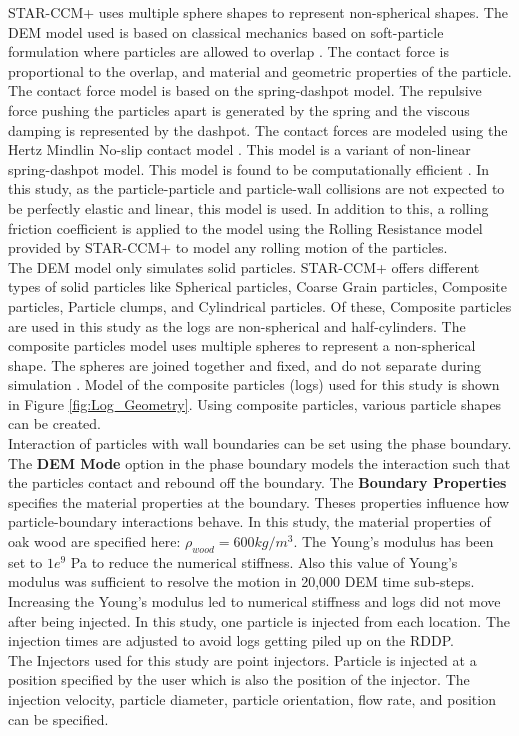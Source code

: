 STAR-CCM+ uses multiple sphere shapes to represent non-spherical shapes. The DEM model used is based on classical mechanics based on soft-particle formulation where particles are allowed to overlap \cite{DEM}. The contact force is proportional to the overlap, and material and geometric properties of the particle. The contact force model is based on the spring-dashpot model. The repulsive force pushing the particles apart is generated by the spring and the viscous damping is represented by the dashpot. The contact forces are modeled using the Hertz Mindlin No-slip contact model \cite{DEM}. This model is a variant of non-linear spring-dashpot model. This model is found to be computationally efficient \cite{DEM}. In this study, as the particle-particle  and particle-wall collisions are not expected to be perfectly elastic and linear, this model is used. In addition to this, a rolling friction coefficient is applied to the model using the Rolling Resistance model provided by STAR-CCM+ to model any rolling motion of the particles.\\
The DEM model only simulates solid particles. STAR-CCM+ offers different types of solid particles like Spherical particles, Coarse Grain particles, Composite particles, Particle clumps, and Cylindrical particles. Of these, Composite particles are used in this study as the logs are non-spherical and half-cylinders. The composite particles model uses multiple spheres to represent a non-spherical shape. The spheres are joined together and fixed, and do not separate during simulation \cite{CompositeP}. Model of the composite particles (logs) used for this study is shown in Figure \ref{fig:Log_Geometry}. Using composite particles, various particle shapes can be created. \\
Interaction of particles with wall boundaries can be set using the phase boundary. The \textbf{DEM Mode} option in the phase boundary models the interaction such that the particles contact and rebound off the boundary. The \textbf{Boundary Properties} specifies the material properties at the boundary. Theses properties influence how particle-boundary interactions behave. In this study, the material properties of oak wood are specified here: $\rho_{wood} = 600 kg/m^3$. The Young's modulus has been set to $1e^9$ Pa to reduce the numerical stiffness. Also this value of Young's modulus was sufficient to resolve the motion in 20,000 DEM time sub-steps. Increasing the Young's modulus led to numerical stiffness and logs did not move after being injected. In this study, one particle is injected from each location. The injection times are adjusted to avoid logs getting piled up on the RDDP.\\
The Injectors used for this study are point injectors. Particle is injected at a position specified by the user which is also the position of the injector. The injection velocity, particle diameter, particle orientation, flow rate, and position can be specified. 
